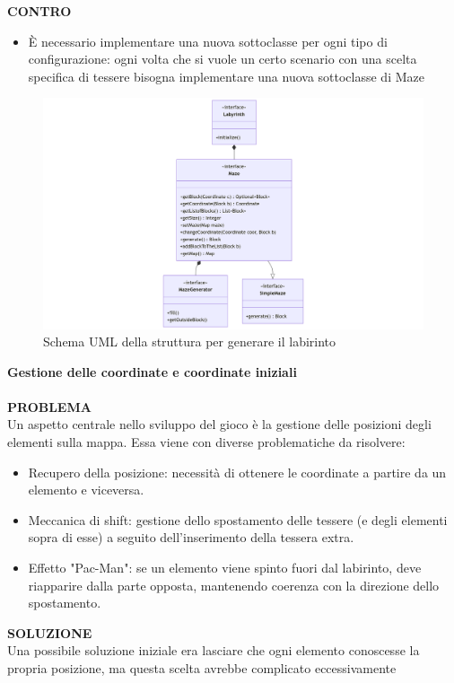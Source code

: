 \documentclass[a4paper,12pt]{report}
\begin{document}
\textbf{CONTRO}
\begin{itemize}
	\item È necessario implementare una nuova sottoclasse per ogni tipo di configurazione: ogni volta che si vuole un certo scenario con una scelta specifica di tessere bisogna 
	implementare una nuova sottoclasse di Maze
\end{itemize}
\begin{figure}[H]
	\centering{}
	\includegraphics[width=14cm]{img/GenerazioneLabirinto.png}
	\caption{Schema UML della struttura per generare il labirinto}
	\label{img:Generazione Labirinto}
\end{figure}
\textbf{Gestione delle coordinate e coordinate iniziali}
\\
\\
\textbf{PROBLEMA}\\
Un aspetto centrale nello sviluppo del gioco è la gestione delle posizioni degli elementi sulla mappa.
Essa viene con diverse problematiche da risolvere:
\begin{itemize}
	\item Recupero della posizione: necessità di ottenere le coordinate a partire da un elemento e viceversa.
	\item Meccanica di shift: gestione dello spostamento delle tessere (e degli elementi sopra di esse) a seguito dell’inserimento della tessera extra.
	\item Effetto "Pac-Man": se un elemento viene spinto fuori dal labirinto, deve riapparire dalla parte opposta, mantenendo coerenza con la direzione dello spostamento.
\end{itemize}
\textbf{SOLUZIONE}\\
Una possibile soluzione iniziale era lasciare che ogni elemento conoscesse 
la propria posizione, ma questa scelta avrebbe complicato eccessivamente 
\end{document}
